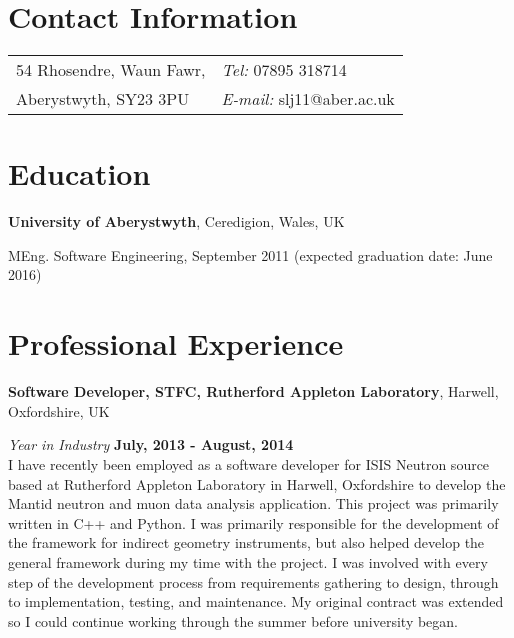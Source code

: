 \documentclass[margin,line]{res}
\newenvironment{list1}{
  \begin{list}{\ding{113}}{%
      \setlength{\itemsep}{0in}
      \setlength{\parsep}{0in} \setlength{\parskip}{0in}
      \setlength{\topsep}{0in} \setlength{\partopsep}{0in}
      \setlength{\leftmargin}{0.17in}}}{\end{list}}
\begin{document}

\begin{resume}
\section{\sc Contact Information}
\vspace{.05in}
\begin{tabular}{@{}p{2in}p{4in}}
54 Rhosendre, Waun Fawr,             & {\it Tel:}  07895 318714 \\
Aberystwyth, SY23 3PU & {\it E-mail:}  slj11@aber.ac.uk\\
\end{tabular}

\section{\sc Education}
{\bf University of Aberystwyth}, Ceredigion, Wales, UK\\
\vspace*{-.1in}
\begin{list1}
\item[] MEng. Software Engineering, September 2011 (expected
  graduation date: June 2016) \\
\end{list1}

\section{\sc Professional Experience}
{\bf Software Developer, STFC, Rutherford Appleton Laboratory}, Harwell, Oxfordshire, UK

\vspace{-.3cm}
{\em Year in Industry} \hfill {\bf July, 2013 - August, 2014}\\
I have recently been employed as a software developer for ISIS Neutron source based at Rutherford Appleton Laboratory in Harwell, Oxfordshire to develop the Mantid neutron and muon data analysis application. This project was primarily written in C++ and Python. I was primarily responsible for the development of the framework for indirect geometry instruments, but also helped develop the general framework during my time with the project. I was involved with every step of the development process from requirements gathering to design, through to implementation, testing, and maintenance. My original contract was extended so I could continue working through the summer before university began.


\end{resume}
\end{document}
